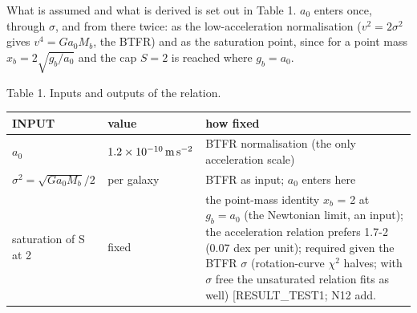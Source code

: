 \documentclass[
  10pt,
]{article}
\begin{document}
What is assumed and what is derived is set out in Table 1. $a_0$ enters
once, through $\sigma$, and from there twice: as the low-acceleration
normalisation ($v^2=2\sigma^2$ gives $v^4=G a_0 M_b$, the BTFR)
and as the saturation point, since for a point mass $x_b=2\sqrt{g_b/a_0}$ and the cap $S=2$ is reached where $g_b=a_0$.

Table 1. Inputs and outputs of the relation.

\begin{longtable}[]{@{}lll@{}}
\toprule
\begin{minipage}[b]{0.24\columnwidth}\raggedright
INPUT\strut
\end{minipage} & \begin{minipage}[b]{0.20\columnwidth}\raggedright
value\strut
\end{minipage} & \begin{minipage}[b]{0.50\columnwidth}\raggedright
how fixed\strut
\end{minipage}\tabularnewline
\midrule
\endhead
\begin{minipage}[t]{0.24\columnwidth}\raggedright
$a_0$\strut
\end{minipage} & \begin{minipage}[t]{0.20\columnwidth}\raggedright
$1.2\times10^{-10}\,{\rm m\,s^{-2}}$\strut
\end{minipage} & \begin{minipage}[t]{0.50\columnwidth}\raggedright
BTFR normalisation (the only acceleration scale)\strut
\end{minipage}\tabularnewline
\begin{minipage}[t]{0.24\columnwidth}\raggedright
$\sigma^2=\sqrt{G a_0 M_b}/2$\strut
\end{minipage} & \begin{minipage}[t]{0.20\columnwidth}\raggedright
per galaxy\strut
\end{minipage} & \begin{minipage}[t]{0.50\columnwidth}\raggedright
BTFR as input; $a_0$ enters here\strut
\end{minipage}\tabularnewline
\begin{minipage}[t]{0.24\columnwidth}\raggedright
saturation of S at 2\strut
\end{minipage} & \begin{minipage}[t]{0.20\columnwidth}\raggedright
fixed\strut
\end{minipage} & \begin{minipage}[t]{0.50\columnwidth}\raggedright
the point-mass identity $x_b$ = 2 at $g_b=a_0$ (the Newtonian limit, an input); the acceleration relation prefers 1.7-2 (0.07 dex per unit); required given the BTFR $\sigma$ (rotation-curve $\chi^2$ halves; with $\sigma$ free the unsaturated relation fits as well) {[}RESULT\_TEST1; N12 add.

\end{minipage}
\end{longtable}
\end{document}
